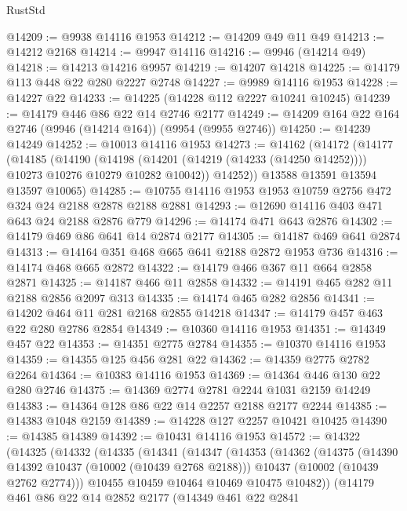 \begin{lexlean}{RustStd}
\begin{coremodule}
@14209 := @9938 @14116 @1953
@14212 := @14209 @49 @11 @49
@14213 := @14212 @2168
@14214 := @9947 @14116
@14216 := @9946 (@14214 @49)
@14218 := @14213 @14216 @9957
@14219 := @14207 @14218
@14225 := @14179 @113 @448 @22 @280 @2227 @2748
@14227 := @9989 @14116 @1953
@14228 := @14227 @22
@14233 := @14225 (@14228 @112 @2227 @10241 @10245)
@14239 := @14179 @446 @86 @22 @14 @2746 @2177
@14249 := @14209 @164 @22 @164 @2746 (@9946 (@14214 @164)) (@9954 (@9955 @2746))
@14250 := @14239 @14249
@14252 := @10013 @14116 @1953
@14273 := @14162
    (@14172
      (@14177
        (@14185
          (@14190
            (@14198 (@14201 (@14219 (@14233 (@14250 @14252)))) @10273 @10276 @10279 @10282 @10042))
          @14252))
      @13588
      @13591
      @13594
      @13597
      @10065)
@14285 := @10755 @14116 @1953 @1953 @10759 @2756 @472 @324 @24 @2188 @2878 @2188 @2881
@14293 := @12690 @14116 @403 @471 @643 @24 @2188 @2876 @779
@14296 := @14174 @471 @643 @2876
@14302 := @14179 @469 @86 @641 @14 @2874 @2177
@14305 := @14187 @469 @641 @2874
@14313 := @14164 @351 @468 @665 @641 @2188 @2872 @1953 @736
@14316 := @14174 @468 @665 @2872
@14322 := @14179 @466 @367 @11 @664 @2858 @2871
@14325 := @14187 @466 @11 @2858
@14332 := @14191 @465 @282 @11 @2188 @2856 @2097 @313
@14335 := @14174 @465 @282 @2856
@14341 := @14202 @464 @11 @281 @2168 @2855 @14218
@14347 := @14179 @457 @463 @22 @280 @2786 @2854
@14349 := @10360 @14116 @1953
@14351 := @14349 @457 @22
@14353 := @14351 @2775 @2784
@14355 := @10370 @14116 @1953
@14359 := @14355 @125 @456 @281 @22
@14362 := @14359 @2775 @2782 @2264
@14364 := @10383 @14116 @1953
@14369 := @14364 @446 @130 @22 @280 @2746
@14375 := @14369 @2774 @2781 @2244 @1031 @2159 @14249
@14383 := @14364 @128 @86 @22 @14 @2257 @2188 @2177 @2244
@14385 := @14383 @1048 @2159
@14389 := @14228 @127 @2257 @10421 @10425
@14390 := @14385 @14389
@14392 := @10431 @14116 @1953
@14572 := @14322
    (@14325
      (@14332
        (@14335
          (@14341
            (@14347
              (@14353
                (@14362
                  (@14375
                    (@14390 @14392 @10437 (@10002 (@10439 @2768 @2188)))
                    @10437
                    (@10002 (@10439 @2762 @2774)))
                  @10455
                  @10459
                  @10464
                  @10469
                  @10475
                  @10482))
              (@14179
                @461
                @86
                @22
                @14
                @2852
                @2177
                (@14349
                  @461
                  @22
                  @2841

\end{coremodule}
\end{lexlean}

